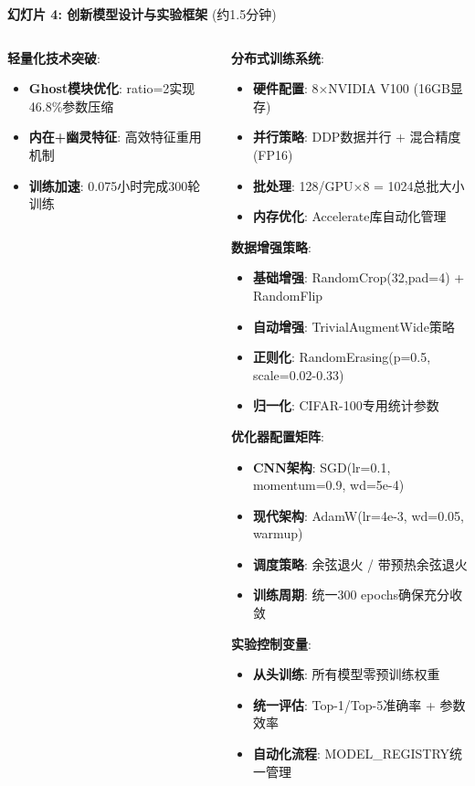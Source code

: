 \documentclass[10pt]{beamer}
\begin{document}
\begin{frame}{\textbf{幻灯片 4: 创新模型设计与实验框架} (约1.5分钟)}
{\begin{columns}[T]
\begin{column}{0.5\textwidth}
        \vspace{0.2em}
        \textbf{轻量化技术突破}:
        \begin{itemize}
            \item \textbf{Ghost模块优化}: ratio=2实现46.8\%参数压缩
            \item \textbf{内在+幽灵特征}: 高效特征重用机制
            \item \textbf{训练加速}: 0.075小时完成300轮训练
        \end{itemize}
    \end{column}
    \begin{column}{0.5\textwidth}
        \textbf{分布式训练系统}:
        \begin{itemize}
            \item \textbf{硬件配置}: 8×NVIDIA V100 (16GB显存)
            \item \textbf{并行策略}: DDP数据并行 + 混合精度(FP16)
            \item \textbf{批处理}: 128/GPU×8 = 1024总批大小
            \item \textbf{内存优化}: Accelerate库自动化管理
        \end{itemize}
        
        \textbf{数据增强策略}:
        \begin{itemize}
            \item \textbf{基础增强}: RandomCrop(32,pad=4) + RandomFlip
            \item \textbf{自动增强}: TrivialAugmentWide策略
            \item \textbf{正则化}: RandomErasing(p=0.5, scale=0.02-0.33)
            \item \textbf{归一化}: CIFAR-100专用统计参数
        \end{itemize}
        
        \textbf{优化器配置矩阵}:
        \begin{itemize}
            \item \textbf{CNN架构}: SGD(lr=0.1, momentum=0.9, wd=5e-4)
            \item \textbf{现代架构}: AdamW(lr=4e-3, wd=0.05, warmup)
            \item \textbf{调度策略}: 余弦退火 / 带预热余弦退火
            \item \textbf{训练周期}: 统一300 epochs确保充分收敛
        \end{itemize}
        
        \textbf{实验控制变量}:
        \begin{itemize}
            \item \textbf{从头训练}: 所有模型零预训练权重
            \item \textbf{统一评估}: Top-1/Top-5准确率 + 参数效率
            \item \textbf{自动化流程}: MODEL\_REGISTRY统一管理
        \end{itemize}
    \end{column}
\end{columns}
}

\end{frame}
\end{document}
